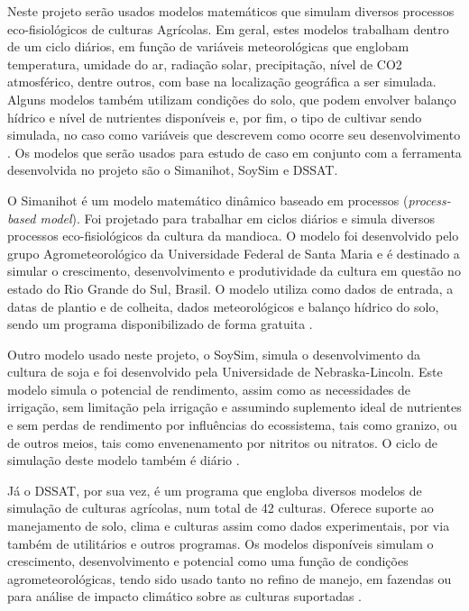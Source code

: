 \documentclass[tg]{mdtufsm}
\begin{document}
	Neste projeto serão usados modelos matemáticos que simulam diversos processos eco-fisiológicos de culturas Agrícolas. Em geral, estes modelos trabalham dentro de um ciclo diários, em função de variáveis meteorológicas que englobam temperatura, umidade do ar, radiação solar, precipitação, nível de CO2 atmosférico, dentre outros, com base na localização geográfica a ser simulada. Alguns modelos também utilizam condições do solo, que podem envolver balanço hídrico e nível de nutrientes disponíveis e, por fim, o tipo de cultivar sendo simulada, no caso como variáveis que descrevem como ocorre seu desenvolvimento \cite{simanihotArt}. Os modelos que serão usados para estudo de caso em conjunto com a ferramenta desenvolvida no projeto são o Simanihot, SoySim e DSSAT.

	O Simanihot é um modelo matemático dinâmico baseado em processos (\emph{process-based model}). Foi projetado para trabalhar em ciclos diários e simula diversos processos eco-fisiológicos da cultura da mandioca. O modelo foi desenvolvido pelo grupo Agrometeorológico da Universidade Federal de Santa Maria e é destinado a simular o crescimento, desenvolvimento e produtividade da cultura em questão no estado do Rio Grande do Sul, Brasil. O modelo utiliza como dados de entrada, a datas de plantio e de colheita, dados meteorológicos e balanço hídrico do solo, sendo um programa disponibilizado de forma gratuita \cite{Simanihot}.

	Outro modelo usado neste projeto, o SoySim, simula o desenvolvimento da cultura de soja e foi desenvolvido pela Universidade de Nebraska-Lincoln. Este modelo simula o potencial de rendimento, assim como as necessidades de irrigação, sem limitação pela irrigação e assumindo suplemento ideal de nutrientes e sem perdas de rendimento por influências do ecossistema, tais como granizo, ou de outros meios, tais como envenenamento por nitritos ou nitratos. O ciclo de simulação deste modelo também é diário \cite{SoySim}.

	Já o DSSAT, por sua vez, é um programa que engloba diversos modelos de simulação de culturas agrícolas, num total de 42 culturas. Oferece suporte ao manejamento de solo, clima e culturas assim como dados experimentais, por via também de utilitários e outros programas. Os modelos disponíveis simulam o crescimento, desenvolvimento e potencial como uma função de condições agrometeorológicas, tendo sido usado tanto no refino de manejo, em fazendas ou para análise de impacto climático sobre as culturas suportadas \cite{dssat}.
\end{document}
